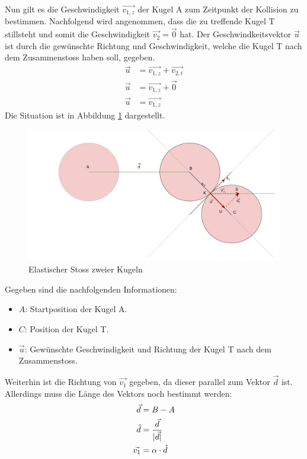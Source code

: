 Nun gilt es die Geschwindigkeit $\vec{v_{1,z}}$ der Kugel A zum Zeitpunkt der Kollision zu bestimmen.
Nachfolgend wird angenommen, dass die zu treffende Kugel T stillsteht und somit die Geschwindigkeit $\vec{v_2} = \vec{0}$ hat.
Der Geschwindkeitsvektor $\vec{u}$ ist durch die gewünschte Richtung und Geschwindigkeit,
welche die Kugel T nach dem Zusammenstoss haben soll, gegeben.
\begin{align}
    \vec{u} &= \vec{v_{1,z}} + \vec{v_{2,t}}\\
    \vec{u} &= \vec{v_{1,z}} + \vec{0}\\
    \vec{u} &= \vec{v_{1,z}}
\end{align}
Die Situation ist in Abbildung \ref{fig:elasticCollisionOfTwoBalls} dargestellt.

\begin{figure}[h!]
    \begin{center}
        \includegraphics[width=0.6\linewidth]{../common/03_billiard_ai/resources/22_kollision_rueckwaerts.png}
    \end{center}
    \caption{Elastischer Stoss zweier Kugeln}
    \label{fig:elasticCollisionOfTwoBalls}
\end{figure}

Gegeben sind die nachfolgenden Informationen:
\begin{itemize}
    \item $A$: Startposition der Kugel A.
    \item $C$: Position der Kugel T.
    \item $\vec{u}$: Gewünschte Geschwindigkeit und Richtung der Kugel T nach dem Zusammenstoss.
\end{itemize}

Weiterhin ist die Richtung von $\vec{v_1}$ gegeben, da dieser parallel zum Vektor $\vec{d}$ ist.
Allerdings muss die Länge des Vektors noch bestimmt werden:
\begin{align}
    \vec{d} &= B - A\\
    \hat{d} &= \frac{\vec{d}}{\lvert \vec{d} \rvert}\\
    \vec{v_1} &= \alpha \cdot \hat{d}
\end{align}

